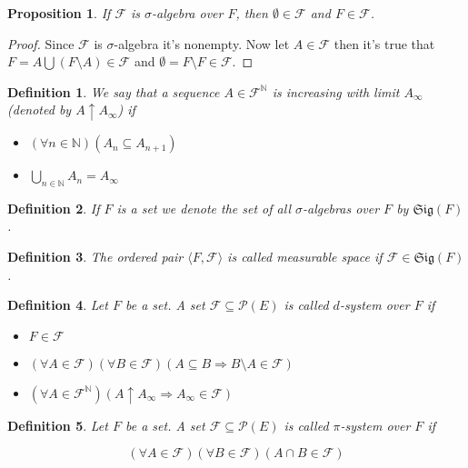 \documentclass[a4paper]{amsart}
\newtheorem{deff}{Definition}
\newtheorem{prop}{Proposition}
\newcommand{\pow}[1]{\mathscr{P}\left(#1\right)}
\newcommand{\pair}[2]{\langle #1, #2\rangle}
\newcommand{\sig}[1]{\mathfrak{Sig}\left(#1\right)}
\newcommand{\NN}{\mathbb{N}}
\newcommand{\convg}{\uparrow}
\begin{document}
\begin{prop}
    If $\mathcal{F}$ is $\sigma$-algebra over $F$, then $\emptyset \in \mathcal{F}$ and
    $F \in \mathcal{F}$.
\end{prop}

\begin{proof}
    Since $\mathcal{F}$ is $\sigma$-algebra it's nonempty. 
    Now let $A \in \mathcal{F}$ then it's true that 
    $ F = A \bigcup \left(F \setminus A\right) \in \mathcal{F}$ 
    and $\emptyset = F \setminus F \in \mathcal{F}$. 
\end{proof}

\begin{deff}
    We say that a sequence $A \in \mathcal{F}^\NN$  is increasing with limit $A_\infty$ (denoted by $A \convg A_\infty$) if
    \begin{itemize}
        \item $\left( \forall n \in \NN\right) \left( A_n \subseteq A_{n+1} \right)$
        \item $\bigcup\limits_{n\in \NN} A_n = A_\infty$
    \end{itemize}
\end{deff}

\begin{deff}
    If $F$ is a set we denote the set of all $\sigma$-algebras over $F$ by $\sig{F}$.
\end{deff}
\begin{deff}
    The ordered pair $\pair{F}{\mathcal{F}}$ is called measurable space if $\mathcal{F} \in \sig{F}$.
\end{deff}

\begin{deff}
    Let $F$ be a set. A set $\mathcal{F} \subseteq \pow{E}$ is called $d$-system over $F$ if 
    \begin{itemize}
        \item $ F \in \mathcal{F}$
        \item $\left(\forall A \in \mathcal{F}\right) \left(\forall B \in \mathcal{F}\right)
        \left( A \subseteq B \Longrightarrow B \setminus A \in \mathcal{F} \right)$
        \item $\left(\forall A \in \mathcal{F}^\NN \right) \left( A \convg A_\infty \Longrightarrow A_\infty \in \mathcal{F} \right)$
    \end{itemize}
\end{deff}

\begin{deff}
    Let $F$ be a set. A set $\mathcal{F} \subseteq \pow{E}$ is 
    called $\pi$-system over $F$ if 
    
    $$ \left(\forall A \in \mathcal{F}\right) \left(\forall B \in 
    \mathcal{F}\right) \left( A \cap B \in \mathcal{F}\right) $$
\end{deff}
\end{document}
